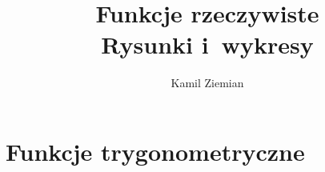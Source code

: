 \documentclass[a4paper,11pt]{article}
\title{Funkcje rzeczywiste \\
  {\Large Rysunki i~wykresy}}
\author{Kamil Ziemian}
\numberwithin{equation}{section}
\begin{document}





\maketitle




















\section{Funkcje trygonometryczne}

\label{sec:Funkcje-trygonometryczne}
\end{document}
